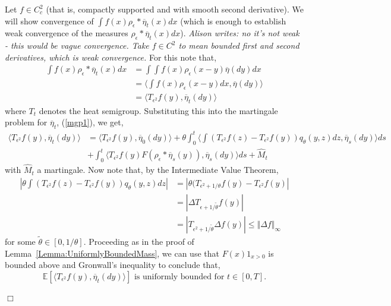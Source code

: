 \documentclass[12pt]{article}
\newenvironment {proof}{{\noindent\bf Proof }}{\hfill $\Box$ \medskip}
\def \tilde{\widetilde}
\newcommand{\IE}{\mathbb E}
\newcommand{\comment}[1]{{\color{blue} \it #1}}
\begin{document}
\begin{proof}

Let $f \in C_c^2$ (that is, compactly supported and with smooth second derivative). We will show convergence of $\int f(x) \rho_\epsilon * \overline{\eta}_t(x) dx$ (which is enough to establish weak convergence of the measures $\rho_\epsilon * \overline{\eta}_t(x) dx$).
\comment{Alison writes: no it's not weak - this would be vague convergence. Take $f \in C^2$ to mean bounded first and second derivatives, which is weak convergence.}
For this note that,
\begin{align*}
\int f(x) \rho_\epsilon * \overline{\eta}_t(x) dx &= \int \int f(x) \rho_\epsilon (x-y) \overline{\eta}(dy) dx \\ & = \langle \int f(x) \rho_\epsilon(x-y) dx, \overline{\eta}(dy) \rangle \\ &= \langle T_{\epsilon^2} f(y), \overline{\eta}_t(dy) \rangle
\end{align*}
where $T_t$ denotes the heat semigroup. Substituting this into the martingale problem for $\overline{\eta}_t$, (\ref{mgp1}), we get,
\begin{align}
\langle T_{\epsilon^2} f(y), \overline{\eta}_t(dy) \rangle & = \langle T_{\epsilon^2}
 f(y), \overline{\eta}_0(dy) \rangle + \theta \int_0^t \langle \int (T_{\epsilon^2} f(z) - T_{\epsilon^2} f(y))q_\theta(y,z)dz, \overline{\eta}_s(dy)\rangle ds \nonumber \\ &+\int_0^t \langle T_{\epsilon^2} f(y) F(\rho_\epsilon*\overline{\eta}_s(y)), \overline{\eta}_s(dy) \rangle ds + \widehat{M}_t \label{MGPT_epsilon} \end{align}
 with $\widehat{M}_t$ a martingale. Now note that,
by the Intermediate Value Theorem,
 \begin{align}
    | \theta \int (T_{\epsilon^2} f(z) - T_{\epsilon^2}f(y))q_\theta(y,z) dz | &= |\theta( T_{\epsilon^2 + 1/\theta} f(y) - T_{\epsilon^2}f(y)| \nonumber \\ &= | \Delta T_{\epsilon+1/\tilde{\theta}} f(y) | \nonumber \\ &=|T_{\epsilon^2 + 1/\tilde{\theta}} \Delta f(y) | \leq \Vert \Delta f \Vert_{\infty} \label{ShortBoundLaplacianHS}
 \end{align}
for some $\tilde{\theta} \in [0,1/\theta]$.
Proceeding as in the proof of Lemma~\ref{Lemma:UniformlyBoundedMass}, we can use that $F(x)1_{x > 0}$ is bounded above and Gronwall's inequality to conclude that,
\[ \IE\left[\langle T_{\epsilon^2} f(y), \overline{\eta}_t(dy) \rangle \right] \text{ is uniformly bounded for } t \in [0,T].\]

\end{proof}
\end{document}

